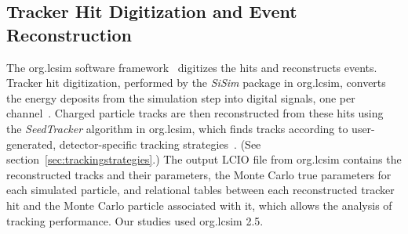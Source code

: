 \subsection{Tracker Hit Digitization and Event Reconstruction}
\label{sec:recon}
The org.lcsim software framework~\cite{lcsimurl,graf2011org} digitizes the hits
and reconstructs events.
Tracker hit digitization, performed by the \textit{SiSim} %
package in org.lcsim,
converts the energy deposits from the simulation step
into digital signals, one per channel~\cite{Grefe:2014pba}. 
Charged particle tracks are then reconstructed from these hits using the \textit{SeedTracker}
algorithm %
 in org.lcsim, which finds tracks  according to user-generated,
detector-specific tracking strategies~\cite{Grefe:2014pba}.
(See section~\ref{sec:trackingstrategies}.)
The output LCIO file from org.lcsim contains the reconstructed
tracks and their parameters, the Monte Carlo true parameters for each simulated
particle, and relational tables between each reconstructed tracker hit
and the Monte Carlo particle associated with it, which allows the analysis
of tracking performance.
Our studies used org.lcsim 2.5.

